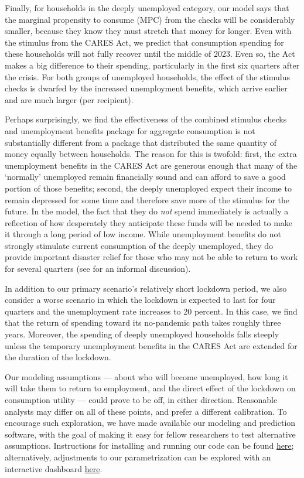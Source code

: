 \documentclass[titlepage,a4paper]{\econtex}
\begin{document}
Finally, for households in the deeply unemployed category, our model says that the marginal propensity to consume (MPC) from the checks will be considerably smaller, because they know they must stretch that money for longer.
Even with the stimulus from the CARES Act, we predict that consumption spending for these households will not fully recover until the middle of 2023.
Even so, the Act makes a big difference to their spending, particularly in the first six quarters after the crisis.
For both groups of unemployed households, the effect of the stimulus checks is dwarfed by the increased unemployment benefits, which arrive earlier and are much larger (per recipient).

Perhaps surprisingly, we find the effectiveness of the combined stimulus checks and unemployment benefits package for aggregate consumption is not substantially different from a package that distributed the same quantity of money equally between households.
The reason for this is twofold: first, the extra unemployment benefits in the CARES Act are generous enough that many of the `normally' unemployed remain financially sound and can afford to save a good portion of those benefits; second, the deeply unemployed expect their income to remain depressed for some time and therefore save more of the stimulus for the future.  In the model, the fact that they do \textit{not} spend immediately is actually a reflection of how desperately they anticipate these funds will be needed to make it through a long period of low income.
While unemployment benefits do not strongly stimulate current consumption of the deeply unemployed, they do provide important disaster relief for those who may not be able to return to work for several quarters (see \cite{krugman_corona} for an informal discussion).

In addition to our primary scenario's relatively short lockdown period, we also consider a worse scenario in which the lockdown is expected to last for four quarters and the unemployment rate increases to 20 percent.
In this case, we find that the return of spending toward its no-pandemic path takes roughly three years. Moreover, the spending of deeply unemployed households falls steeply unless the temporary unemployment benefits in the CARES Act are extended for the duration of the lockdown.

Our modeling assumptions --- about who will become unemployed, how long it will take them to return to employment, and the direct effect of the lockdown on consumption utility --- could prove to be off, in either direction.
Reasonable analysts may differ on all of these points, and prefer a different calibration.
To encourage such exploration, we have made available our modeling and prediction software, with the goal of making it easy for fellow researchers to test alternative assumptions.  Instructions for installing and running our code can be found \href{https://github.com/econ-ark/Pandemic#reproduction-instructions}{here}; alternatively, adjustments to our parametrization can be explored with an interactive dashboard \href{http://econ-ark.org/pandemicdashboard}{here}.
\end{document}
